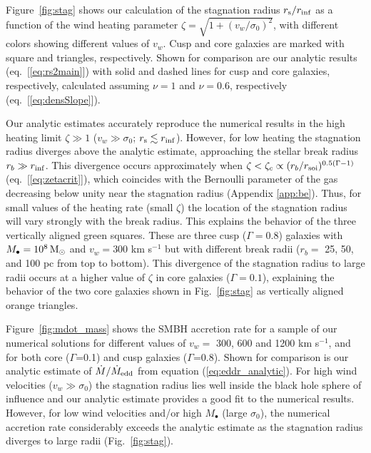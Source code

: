 \documentclass[usenatbib,fleqn]{mn2e}
\newcommand{\rb}{r_b}
\newcommand{\Mbh}[1][]{M_{\bullet#1}}
\newcommand{\vwO}{v_{w}}
\newcommand{\densSlope}{\nu}
\begin{document}
Figure~\ref{fig:stag} shows our calculation of the stagnation radius
$r_{\rm s}/r_{\rm inf}$ as a function of the wind heating parameter
$\zeta = \sqrt{1+(v_w/\sigma_0)^{2}}$, with different colors
showing different values of $v_{w}$.  Cusp and core galaxies are
marked with square and triangles, respectively.  Shown for comparison
are our analytic results (eq.~[\ref{eq:rs2main}]) with solid and
dashed lines for cusp and core galaxies, respectively, calculated
assuming $\densSlope = 1$ and $\densSlope= 0.6$, respectively
(eq.~[\ref{eq:densSlope}]).

Our analytic estimates accurately reproduce the numerical results in
the high heating limit $\zeta \gg 1$ ($v_w \gg \sigma_0$; $r_{\rm s}
\lesssim r_{\rm inf}$).  However, for low heating the stagnation
radius diverges above the analytic estimate, approaching the stellar
break radius $r_b \gg r_{\rm inf}$.  This divergence occurs
approximately when $\zeta < \zeta_c \propto (r_b/r_{\rm
  soi})^{0.5(\Gamma-1)}$ (eq.~[\ref{eq:zetacrit}]), which coincides
with the Bernoulli parameter of the gas decreasing below unity near
the stagnation radius (Appendix \ref{app:be}).  Thus, for small values
of the heating rate (small $\zeta$) the location of the stagnation
radius will vary strongly with the break radius. This explains the
behavior of the three vertically aligned green squares. These are three
cusp ($\Gamma=0.8$) galaxies with $\Mbh=10^8 \Msun$ and $v_w=300$ km s$^{-1}$
but with different break radii ($\rb=$ 25, 50, and 100 pc from top to
bottom). This divergence of the stagnation radius to large radii
occurs at a higher value of $\zeta$ in core galaxies ($\Gamma = 0.1$),
explaining the behavior of the two core galaxies shown in
Fig.~\ref{fig:stag} as vertically aligned orange triangles.  

Figure~\ref{fig:mdot_mass} shows the SMBH accretion rate for a sample of
our numerical solutions for different values of
$\vwO =$ 300, 600 and 1200 km s$^{-1}$, and for both core
($\Gamma$=0.1) and cusp galaxies ($\Gamma$=0.8).  Shown for comparison
is our analytic estimate of $\dot{M}/\dot{M}_{\rm edd}$ from equation
(\ref{eq:eddr_analytic}).  For high wind velocities ($v_{w} \gg
\sigma_0$) the stagnation radius lies well inside the black hole sphere of
influence and our analytic estimate provides a good fit to the
numerical results.  However, for low wind velocities and/or high
$M_{\bullet}$ (large $\sigma_0$), the numerical accretion rate
considerably exceeds the analytic estimate as the stagnation radius
diverges to large radii (Fig.~\ref{fig:stag}).
\end{document}
